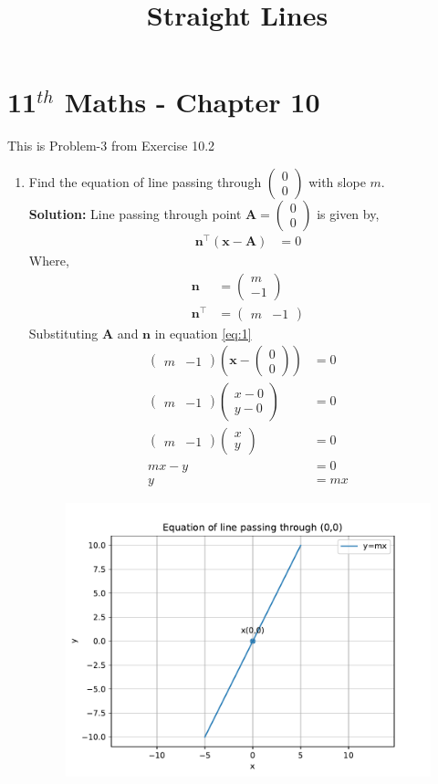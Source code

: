 \documentclass[12pt]{article}
\providecommand{\brak}[1]{\ensuremath{\left(#1\right)}}
\newcommand{\solution}{\noindent \textbf{Solution: }}
\newcommand{\myvec}[1]{\ensuremath{\begin{pmatrix}#1\end{pmatrix}}}
\let\vec\mathbf
\begin{document}
\begin{center}
\title{\textbf{Straight Lines}}
\date{\vspace{-5ex}} %
\maketitle
\end{center}
\setcounter{page}{1}
\section*{11$^{th}$ Maths - Chapter 10}
This is Problem-3 from Exercise 10.2
\begin{enumerate}
	\item Find the equation of line passing through $\myvec{0\\0}$ with slope $m$.\\
\solution
		Line passing through point $\vec{A}=\myvec{0\\0}$ is given by,
\begin{align}
	\vec{n}^\top \brak{\vec{x}-\vec{A}} &= 0\label{eq:1}
\end{align}
Where,
		\begin{align}
			\vec{n} &=\myvec{m \\ -1}\\
			\vec{n}^\top &=\myvec{m & -1}
		\end{align}
		Substituting $\vec{A}$ and $\vec{n}$ in equation \eqref{eq:1}
		\begin{align}
			\myvec{m & -1}\brak{\vec{x}-\myvec{0\\0}} &=0\\
			\myvec{m & -1}\myvec{x-0\\y-0} &=0\\
			\myvec{m & -1}\myvec{x\\y} &= 0\\
			mx-y &=0\\
			y &=mx
		\end{align}
\begin{figure}[!h]
\begin{center}
\includegraphics[width=\columnwidth]{figs/fig.pdf}
\end{center}
\caption{}
\label{fig:Fig1}
\end{figure}
\end{enumerate}
\end{document}
